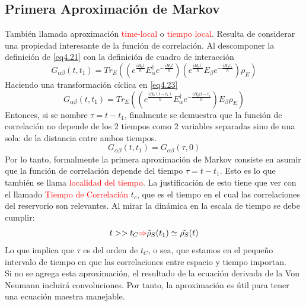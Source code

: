\documentclass{book}
\begin{document}
\subsection{Primera Aproximación de Markov}
También llamada aproximación \textcolor{red}{time-local} o \textcolor{red}{tiempo local}. Resulta de considerar una propiedad interesante de la función de correlación. Al descomponer la definición de \ref{eq4.21} con la definición de cuadro de interacción
\begin{equation}\label{eq4.23}G_{\alpha\beta}(t,t_1)=Tr_E((e^{\frac{iH_0t}{\hbar}}E_\alpha^\dag e^{-\frac{iH_0t}{\hbar}})(e^{\frac{iH_0t_1}{\hbar}}E_\beta e^{-\frac{iH_0t_1}{\hbar}})\rho_E)\end{equation}
Haciendo una transformación cíclica en \ref{eq4.23}
\begin{equation}\label{eq4.24}G_{\alpha\beta}(t,t_1)=Tr_E((e^{\frac{iH_0(t-t_1)}{\hbar}}E_\alpha^\dag e^{-\frac{iH_0(t-t_1}{\hbar}})E_\beta\rho_E)\end{equation}
Entonces, si se nombre $\tau=t-t_1$, finalmente se demuestra que la función de correlación no depende de los 2 tiempos como 2 variables separadas sino de una sola: de la distancia entre ambos tiempos.
\begin{equation}\label{eq4.25}G_{\alpha\beta}(t,t_1)=G_{\alpha\beta}(\tau,0)\end{equation}
Por lo tanto, formalmente la primera aproximación de Markov consiste en asumir que la función de correlación depende del tiempo $\tau=t-t_1$. Esto es lo que también se llama \textcolor{red}{localidad del tiempo}. La justificación de esto tiene que ver con el llamado \textcolor{red}{Tiempo de Correlación} $t_c$, que es el tiempo en el cual las correlaciones del reservorio son relevantes. Al mirar la dinámica en la escala de tiempo se debe cumplir:
\begin{equation}\label{eq4.26}t>>t_C\textcolor{red}{\Rightarrow}\tilde{\rho}_S(t_1)\simeq\tilde{\rho_S}(t) \end{equation} Lo que implica que $\tau$ es del orden de $t_C$, o sea, que estamos en el pequeño intervalo de tiempo en que las correlaciones entre espacio y tiempo importan.\\
Si no se agrega esta aproximación, el resultado de la ecuación derivada de la Von Neumann incluirá convoluciones. Por tanto, la aproximación es útil para tener una ecuación maestra manejable.
\end{document}
